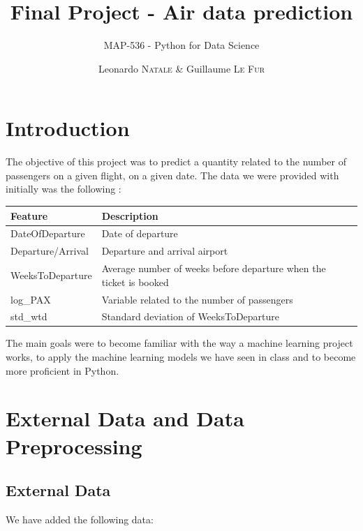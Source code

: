 \documentclass[a4paper,12pt,twoside]{article}
\subtitle{MAP-536 - Python for Data Science}
\title{Final Project - Air data prediction}
\author{Leonardo \textsc{Natale} \& Guillaume \textsc{Le Fur}}
\begin{document}
\maketitle

\section{Introduction}

The objective of this project was to predict a quantity related to the number of passengers on a given flight, on a given date. The data we were provided with initially was the following :

\begin{table}[H]
	\centering
	\begin{tabular}{|l|l|}
	\hline
	\textbf{Feature} & \textbf{Description}                          \\ \hline
	DateOfDeparture  & Date of departure                             \\ \hline
	Departure/Arrival& Departure and arrival airport                 \\ \hline
	WeeksToDeparture & Average number of weeks before departure when the ticket is booked \\ \hline
	log\_PAX          & Variable related to the number of passengers \\ \hline
	std\_wtd          & Standard deviation of WeeksToDeparture       \\ \hline
	\end{tabular}
	\label{table:orig_data}
\end{table}

The main goals were to become familiar with the way a machine learning project works, to apply the machine learning models we have seen in class and to become more proficient in Python.

\section{External Data and Data Preprocessing}

\subsection{External Data}

We have added the following data:
\end{document}
